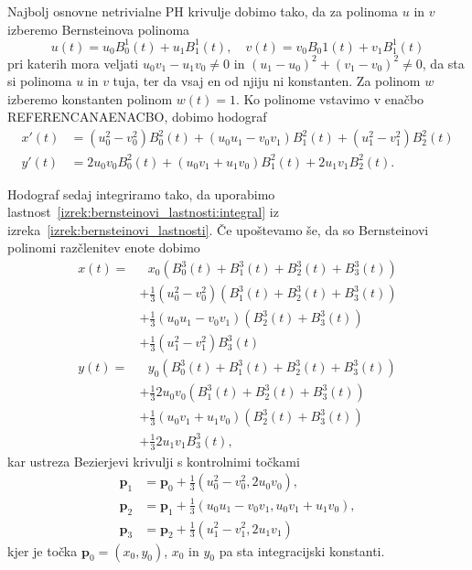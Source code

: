 \documentclass[isrm2, tisk]{fmfdelo}
\newcommand{\p}{\textbf{p}}
\begin{document}
    Najbolj osnovne netrivialne PH krivulje dobimo tako, da za polinoma $u$ in $v$ izberemo Bernsteinova polinoma
    \[u(t)=u_0B_{0}^{1}(t)+u_1B_{1}^{1}(t),\quad v(t)=v_0B_{0}{1}(t)+v_1B_{1}^{1}(t)\]
    pri katerih mora veljati $u_0v_1-u_1v_0\neq 0$ in $(u_1-u_0)^2+(v_1-v_0)^2\neq 0$, da sta si polinoma $u$ in $v$ tuja, ter da vsaj en od njiju ni konstanten.
    Za polinom $w$ izberemo konstanten polinom $w(t)=1$.
    Ko polinome vstavimo v enačbo REFERENCANAENACBO, dobimo hodograf
    \begin{align*}
        x'(t) &=(u_0^2-v_0^2)B_{0}^{2}(t)+(u_0u_1-v_0v_1)B_{1}^{2}(t) + (u_1^2-v_1^2)B_{2}^{2}(t)\\
        y'(t) &= 2u_0 v_0 B_{0}^{2}(t)+(u_0v_1+u_1v_0)B_{1}^{2}(t)+2u_1 v_1 B_{2}^{2}(t).
    \end{align*}

    Hodograf sedaj integriramo tako, da uporabimo lastnost~\ref{izrek:bernsteinovi_lastnosti:integral} iz izreka~\ref{izrek:bernsteinovi_lastnosti}.
    Če upoštevamo še, da so Bernsteinovi polinomi razčlenitev enote dobimo
    \begin{align*}
        x(t) = &\ \ \ x_0(B_{0}^{3}(t) + B_{1}^{3}(t) + B_{2}^{3}(t)+ B_{3}^{3}(t)) \\
        &+ \frac{1}{3}(u_0^2-v_0^2)(B_{1}^{3}(t) + B_{2}^{3}(t)+ B_{3}^{3}(t)) \\
        &+ \frac{1}{3}(u_0u_1-v_0v_1)(B_{2}^{3}(t)+ B_{3}^{3}(t)) \\
        &+ \frac{1}{3} (u_1^2-v_1^2)B_{3}^{3}(t)\\
        y(t) = &\ \ \  y_0(B_{0}^{3}(t) + B_{1}^{3}(t) + B_{2}^{3}(t)+ B_{3}^{3}(t)) \\
        &+ \frac{1}{3}2u_0 v_0(B_{1}^{3}(t) + B_{2}^{3}(t)+ B_{3}^{3}(t)) \\
        &+ \frac{1}{3}(u_0v_1+u_1v_0)(B_{2}^{3}(t)+ B_{3}^{3}(t)) \\
        &+ \frac{1}{3} 2u_1 v_1 B_{3}^{3}(t),
    \end{align*}
    kar ustreza Bezierjevi krivulji s kontrolnimi točkami
    \begin{align}
        \p_1 &=\p_0+\frac{1}{3}(u_0^2-v_0^2,2u_0v_0), \nonumber\\
        \p_2 &= \p_1+\frac{1}{3}(u_0u_1-v_0v_1, u_0v_1+u_1v_0),\nonumber\\
        \p_3 &= \p_2 + \frac{1}{3}(u_1^2-v_1^2, 2u_1v_1) \label{eq:ph-kontrolne}
    \end{align}
    kjer je točka $\p_0=(x_0,y_0)$, $x_0$ in $y_0$ pa sta integracijski konstanti.
\end{document}
